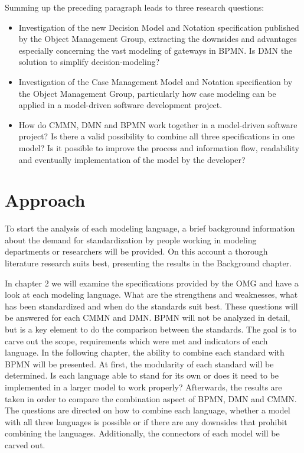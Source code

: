 Summing up the preceding paragraph leads to three research questions: 
\begin{itemize}
\item Investigation of the new Decision Model and Notation specification published by the Object Management Group, extracting the downsides and advantages especially concerning the vast modeling of gateways in BPMN. Is DMN the solution to simplify decision-modeling? 
\item Investigation of the Case Management Model and Notation specification by the Object Management Group, particularly how case modeling can be applied in a model-driven software development project. 
\item How do CMMN, DMN and BPMN work together in a model-driven software project? Is there a valid possibility to combine all three specifications in one model? Is it possible to improve the process and information flow, readability and eventually implementation of the model by the developer?   
\end{itemize}

\section{Approach}
To start the analysis of each modeling language, a brief background information about the demand for standardization by people working in modeling departments or researchers will be provided. On this account a thorough literature research suits best, presenting the results in the Background chapter. 

In chapter 2 we will examine the specifications provided by the OMG and have a look at each modeling language. What are the strengthens and weaknesses, what has been standardized and when do the standards suit best. These questions will be answered for each CMMN and DMN. BPMN will not be analyzed in detail, but is a key element to do the comparison between the standards. The goal is to carve out the scope, requirements which were met and indicators of each language. 
In the following chapter, the ability to combine each standard with BPMN will be presented. At first, the modularity of each standard will be determined. Is each language able to stand for its own or does it need to be implemented in a larger model to work properly? Afterwards, the results are taken in order to compare the combination aspect of BPMN, DMN and CMMN. The questions are directed on how to combine each language, whether a model with all three languages is possible or if there are any downsides that prohibit combining the languages. Additionally, the connectors of each model will be carved out. 

